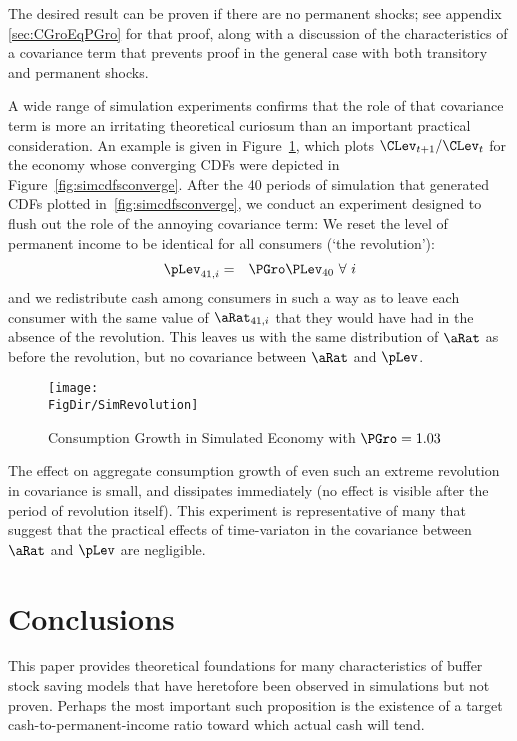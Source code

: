 \documentclass[titlepage]{\econtex}\providecommand{\texname}{BufferStockTheory}%
\providecommand{\FigDir}{Figures}
\renewcommand{\FigDir}{Code/Python/Figures}
\begin{document}
{The desired result can be proven if there are no permanent shocks; see
appendix \ref{sec:CGroEqPGro} for that proof, along with a discussion
of the characteristics of a covariance term that prevents proof in the
general case with both transitory and permanent shocks.

A wide range of simulation experiments confirms that the role of that
covariance term is more an irritating theoretical curiosum than an
important practical consideration.  An example is given in
Figure~\ref{fig:BalancedG}, which plots $\CLev_{t+1}/\CLev_{t}$ for
the economy whose converging CDFs were depicted in Figure~\ref{fig:simcdfsconverge}.
After the 40 periods of simulation that generated
CDFs plotted in~\ref{fig:simcdfsconverge}, we conduct an
experiment designed to flush out the role of the annoying covariance
term: We reset the level of permanent income to be identical for all consumers (`the
revolution'):
\begin{eqnarray*}
   \pLev_{41,i} & = & \PGro \PLev_{40} ~\forall ~ i
\end{eqnarray*}
and we redistribute cash among consumers in such a way as to
leave each consumer with the same value of $\aRat_{41,i}$ that
they would have had in the absence of the revolution.  This
leaves us with the same distribution of $\aRat$ as before the revolution,
but no covariance between $\aRat$ and $\pLev$.

\begin{figure}[h]
\centerline{\texttt{[image: \\FigDir/SimRevolution]}}
\caption{Consumption Growth in Simulated Economy with $\PGro=1.03$}
\label{fig:BalancedG}
\end{figure}

The effect on aggregate consumption growth of even such an extreme
revolution in covariance is small, and dissipates immediately (no
effect is visible after the period of revolution itself).  This
experiment is representative of many that suggest that the practical
effects of time-variaton in the covariance between $\aRat$ and $\pLev$
are negligible.
}%

\section{Conclusions}

This paper provides theoretical foundations for many characteristics
of buffer stock saving models that have heretofore been observed in
simulations but not proven.  Perhaps the most important such
proposition is the existence of a target cash-to-permanent-income
ratio toward which actual cash will tend.
\end{document}
